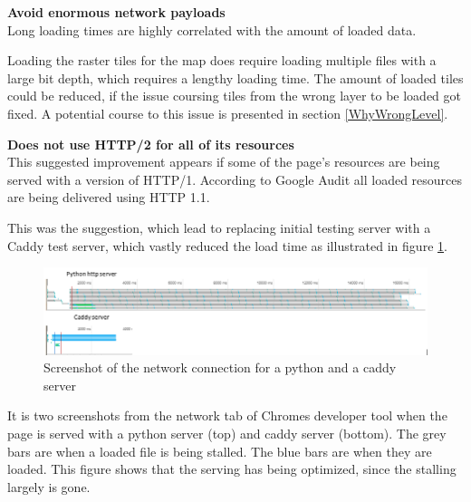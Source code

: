 %
%

\textbf{Avoid enormous network payloads}\\
Long loading times are highly correlated with the amount of loaded data.  
\citep{LoadingTooMuch}

Loading the raster tiles for the map does require loading multiple files with a large bit depth, which requires a lengthy loading time. The amount of loaded tiles could be reduced, if the issue coursing tiles from the wrong layer to be loaded got fixed. A potential course to this issue is presented in section \ref{WhyWrongLevel}.

\textbf{Does not use HTTP/2 for all of its resources}\\
This suggested improvement appears if some of the page’s resources are being served with a version of HTTP/1. According to Google Audit all loaded resources are being delivered using HTTP 1.1.
\citep{HTTP2}

This was the suggestion, which lead to replacing initial testing server with a Caddy test server, which vastly reduced the load time as illustrated in figure \ref{CaddyVsPython}.

\begin{figure} [H]
	\centering
	\includegraphics[width=1\textwidth]{Pictures/CaddyVsPython}
	\caption{Screenshot of the network connection for a python and a caddy server}
	\label{CaddyVsPython}
\end{figure}

It is two screenshots from the network tab of Chromes developer tool when the page is served with a python server (top) and caddy server (bottom). 
The grey bars are when a loaded file is being stalled. The blue bars are when they are loaded. \citep{OnlySix} This figure shows that the serving has being optimized, since the stalling largely is gone. 

